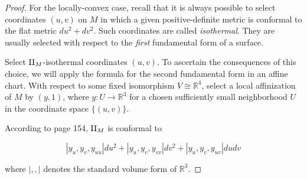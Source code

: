 \documentclass[11pt]{article}
\numberwithin{equation}{section}
\theoremstyle{plain}
\theoremstyle{remark}
\newcommand{\R}{\mathbb{R}}
\newcommand{\II}{\textnormal{II}}
\begin{document}
\begin{proof}


For the locally-convex case, recall that it is always possible to select coordinates $(u,v)$ on $M$ in which a given positive-definite metric is conformal to the flat metric $du^2 + dv^2$. Such coordinates are called \emph{isothermal}. They are usually selected with respect to the \emph{first} fundamental form of a surface.

Select $\II_M$-isothermal coordinates $(u,v)$. To ascertain the consequences of this choice, we will apply the formula for the second fundamental form in an affine chart. With respect to some fixed isomorphism $V\cong \R^{4}$, select a local affinization of $M$ by $(y,1)$, where $y:U\rightarrow \R^3$ for a chosen sufficiently small neighborhood $U$ in the coordinate space $\{(u,v)\}$.

According to \cite{bdocarmo} page 154, $\II_M$ is conformal to

\[ |y_u,y_v,y_{uu}|du^{2} + |y_u,y_v,y_{vv}|dv^{2} + |y_u,y_v,y_{uv}|dudv\] %

where $|,,|$ denotes the standard volume form of $\R^{3}$.


\end{proof}
\end{document}
